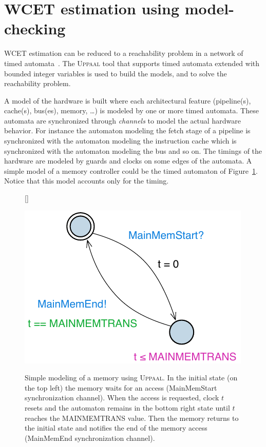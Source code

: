 \section{WCET estimation using model-checking}
\label{sec:modelchecking}

  WCET estimation can be reduced to a reachability problem in a network of timed
  automata~\cite{CB13}. The \textsc{Uppaal} tool that supports timed automata
  extended with bounded integer variables is used to build the models, and to
  solve the reachability problem.

  A model of the hardware is built where each architectural feature
  (pipeline(s), cache(s), bus(es), memory, \dots) is modeled by one or more
  timed automata. These automata are synchronized through {\it channels} to
  model the actual hardware behavior. For instance the automaton modeling the
  fetch stage of a pipeline is synchronized with the automaton modeling the
  instruction cache which is synchronized with the automaton modeling the bus
  and so on. The timings of the hardware are modeled by guards and clocks on
  some edges of the automata. A simple model of a memory controller could be the
  timed automaton of Figure~\ref{fig:memaccess}. Notice that this model accounts
  only for the timing.

  \begin{figure}[b]
    \raggedleft
    [\FBwidth]
    {\caption{Simple modeling of a memory using \textsc{Uppaal}. In
        the initial state (on the top left) the memory waits for an
        access (MainMemStart synchronization channel). When the access
        is requested, clock $t$ resets and the automaton remains in
        the bottom right state until $t$ reaches the {\scriptsize
          MAINMEMTRANS} value. Then the memory returns to the initial
        state and notifies the end of the memory access (MainMemEnd
        synchronization channel).}\label{fig:memaccess}}
    {\includegraphics[scale=.6]{fig/automainmem.pdf}}
  \end{figure}

